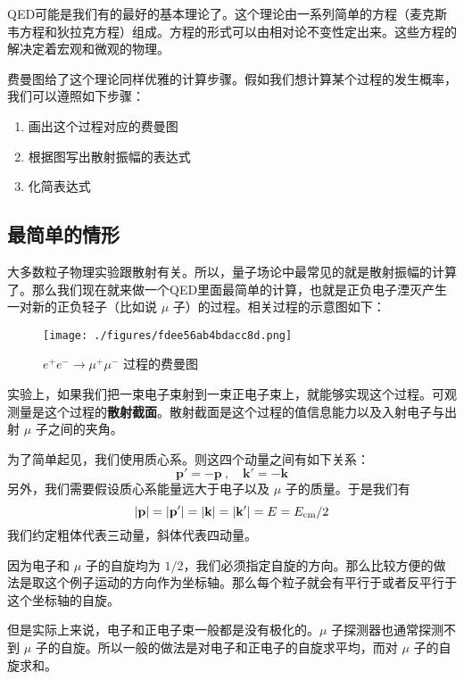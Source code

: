 

QED可能是我们有的最好的基本理论了。这个理论由一系列简单的方程（麦克斯韦方程和狄拉克方程）组成。方程的形式可以由相对论不变性定出来。这些方程的解决定着宏观和微观的物理。

费曼图给了这个理论同样优雅的计算步骤。假如我们想计算某个过程的发生概率，我们可以遵照如下步骤：

\begin{enumerate}
\item 画出这个过程对应的费曼图
\item 根据图写出散射振幅的表达式
\item 化简表达式
\end{enumerate}

\subsection{最简单的情形}
大多数粒子物理实验跟散射有关。所以，量子场论中最常见的就是散射振幅的计算了。那么我们现在就来做一个QED里面最简单的计算，也就是正负电子湮灭产生一对新的正负轻子（比如说 $\mu$ 子）的过程。相关过程的示意图如下：

\begin{figure}[ht]
\centering
\texttt{[image: ./figures/fdee56ab4bdacc8d.png]}
\caption{$e^+e^-\rightarrow\mu^+\mu^-$ 过程的费曼图} \label{fig_QFT0_1}
\end{figure}

实验上，如果我们把一束电子束射到一束正电子束上，就能够实现这个过程。可观测量是这个过程的\textbf{散射截面}。散射截面是这个过程的值信息能力以及入射电子与出射 $\mu$ 子之间的夹角。

为了简单起见，我们使用质心系。则这四个动量之间有如下关系：
\begin{equation}
\mathbf p' = - \mathbf p~, \quad \mathbf k'=-\mathbf k
\end{equation}
另外，我们需要假设质心系能量远大于电子以及 $\mu$ 子的质量。于是我们有
\begin{equation}
|\mathbf p| = |\mathbf p'| = |\mathbf k| = |\mathbf k'| = E = E_{\rm cm}/2
\end{equation}
我们约定粗体代表三动量，斜体代表四动量。

因为电子和 $\mu$ 子的自旋均为 $1/2$，我们必须指定自旋的方向。那么比较方便的做法是取这个例子运动的方向作为坐标轴。那么每个粒子就会有平行于或者反平行于这个坐标轴的自旋。

但是实际上来说，电子和正电子束一般都是没有极化的。$\mu$ 子探测器也通常探测不到 $\mu$ 子的自旋。所以一般的做法是对电子和正电子的自旋求平均，而对 $\mu$ 子的自旋求和。

